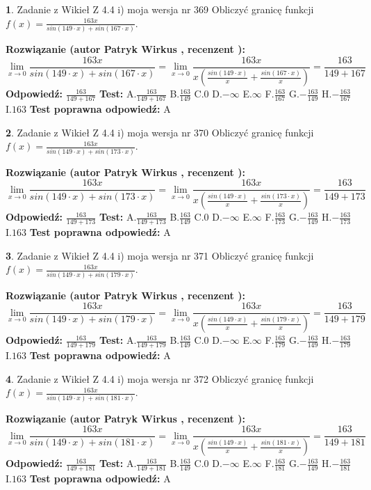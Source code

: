 \documentclass[12pt, a4paper]{article}
\theoremstyle{definition} %
\newtheorem{zad}{}
\newcommand{\zadStart}[1]{\begin{zad}#1\newline}
\newcommand{\zadStop}{\end{zad}}
\newcommand{\rozwStart}[2]{\noindent \textbf{Rozwiązanie (autor #1 , recenzent #2): }\newline}
\newcommand{\rozwStop}{\newline}
\newcommand{\odpStart}{\noindent \textbf{Odpowiedź:}\newline}
\newcommand{\odpStop}{\newline}
\newcommand{\testStart}{\noindent \textbf{Test:}\newline}
\newcommand{\testStop}{\newline}
\newcommand{\kluczStart}{\noindent \textbf{Test poprawna odpowiedź:}\newline}
\newcommand{\kluczStop}{\newline}
\begin{document}
\zadStart{Zadanie z Wikieł Z 4.4 i) moja wersja nr 369}
Obliczyć granicę funkcji $f(x)=\frac{163x}{sin(149\cdot x) +sin(167\cdot x)}$.
\zadStop
\rozwStart{Patryk Wirkus}{}
$$\lim\limits_{x\to 0}\frac{163x}{sin(149\cdot x) +sin(167\cdot x)}=\lim\limits_{x\to 0}\frac{163x}{x(\frac{sin(149\cdot x)}{x}+\frac{sin(167\cdot x)}{x})}=\frac{163}{149+167}$$
\rozwStop
\odpStart
$\frac{163}{149+167}$
\odpStop
\testStart
A.$\frac{163}{149+167}$
B.$\frac{163}{149}$
C.$0$
D.$-\infty$
E.$\infty$
F.$\frac{163}{167}$
G.$-\frac{163}{149}$
H.$-\frac{163}{167}$
I.$163$
\testStop
\kluczStart
A
\kluczStop



\zadStart{Zadanie z Wikieł Z 4.4 i) moja wersja nr 370}
Obliczyć granicę funkcji $f(x)=\frac{163x}{sin(149\cdot x) +sin(173\cdot x)}$.
\zadStop
\rozwStart{Patryk Wirkus}{}
$$\lim\limits_{x\to 0}\frac{163x}{sin(149\cdot x) +sin(173\cdot x)}=\lim\limits_{x\to 0}\frac{163x}{x(\frac{sin(149\cdot x)}{x}+\frac{sin(173\cdot x)}{x})}=\frac{163}{149+173}$$
\rozwStop
\odpStart
$\frac{163}{149+173}$
\odpStop
\testStart
A.$\frac{163}{149+173}$
B.$\frac{163}{149}$
C.$0$
D.$-\infty$
E.$\infty$
F.$\frac{163}{173}$
G.$-\frac{163}{149}$
H.$-\frac{163}{173}$
I.$163$
\testStop
\kluczStart
A
\kluczStop



\zadStart{Zadanie z Wikieł Z 4.4 i) moja wersja nr 371}
Obliczyć granicę funkcji $f(x)=\frac{163x}{sin(149\cdot x) +sin(179\cdot x)}$.
\zadStop
\rozwStart{Patryk Wirkus}{}
$$\lim\limits_{x\to 0}\frac{163x}{sin(149\cdot x) +sin(179\cdot x)}=\lim\limits_{x\to 0}\frac{163x}{x(\frac{sin(149\cdot x)}{x}+\frac{sin(179\cdot x)}{x})}=\frac{163}{149+179}$$
\rozwStop
\odpStart
$\frac{163}{149+179}$
\odpStop
\testStart
A.$\frac{163}{149+179}$
B.$\frac{163}{149}$
C.$0$
D.$-\infty$
E.$\infty$
F.$\frac{163}{179}$
G.$-\frac{163}{149}$
H.$-\frac{163}{179}$
I.$163$
\testStop
\kluczStart
A
\kluczStop



\zadStart{Zadanie z Wikieł Z 4.4 i) moja wersja nr 372}
Obliczyć granicę funkcji $f(x)=\frac{163x}{sin(149\cdot x) +sin(181\cdot x)}$.
\zadStop
\rozwStart{Patryk Wirkus}{}
$$\lim\limits_{x\to 0}\frac{163x}{sin(149\cdot x) +sin(181\cdot x)}=\lim\limits_{x\to 0}\frac{163x}{x(\frac{sin(149\cdot x)}{x}+\frac{sin(181\cdot x)}{x})}=\frac{163}{149+181}$$
\rozwStop
\odpStart
$\frac{163}{149+181}$
\odpStop
\testStart
A.$\frac{163}{149+181}$
B.$\frac{163}{149}$
C.$0$
D.$-\infty$
E.$\infty$
F.$\frac{163}{181}$
G.$-\frac{163}{149}$
H.$-\frac{163}{181}$
I.$163$
\testStop
\kluczStart
A
\kluczStop
\end{document}
